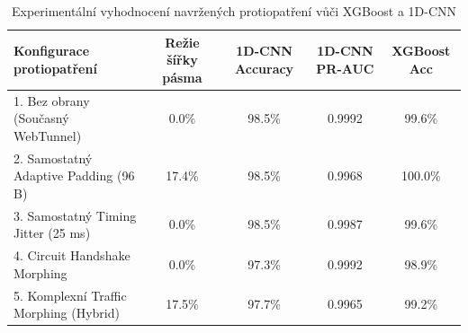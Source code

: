 \begin{table}[htbp]
\centering
\caption{Experimentální vyhodnocení navržených protiopatření vůči XGBoost a 1D-CNN}
\label{tab:defense_evaluation}
\begin{tabular}{lcccc}
\hline
\textbf{Konfigurace protiopatření} & \textbf{Režie šířky pásma} & \textbf{1D-CNN Accuracy} & \textbf{1D-CNN PR-AUC} & \textbf{XGBoost Acc} \\
\hline
1. Bez obrany (Současný WebTunnel) & 0.0\% & 98.5\% & 0.9992 & 99.6\% \\
2. Samostatný Adaptive Padding (96 B) & 17.4\% & 98.5\% & 0.9968 & 100.0\% \\
3. Samostatný Timing Jitter (25 ms) & 0.0\% & 98.5\% & 0.9987 & 99.6\% \\
4. Circuit Handshake Morphing & 0.0\% & 97.3\% & 0.9992 & 98.9\% \\
5. Komplexní Traffic Morphing (Hybrid) & 17.5\% & 97.7\% & 0.9965 & 99.2\% \\
\hline
\end{tabular}
\end{table}
